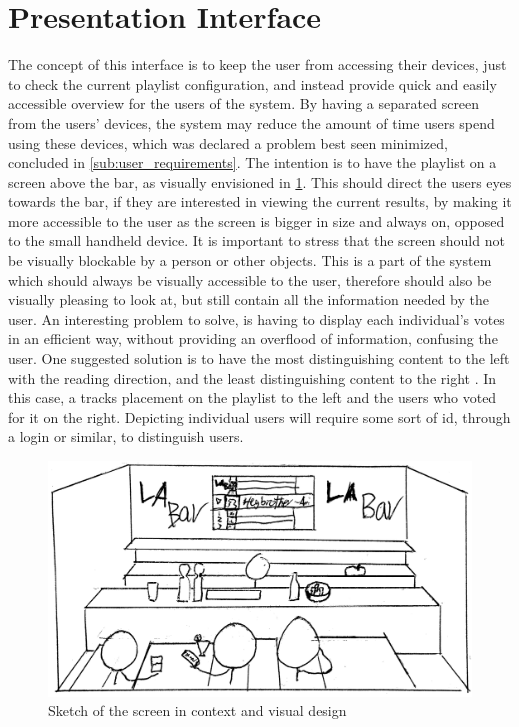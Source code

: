 \section{Presentation Interface}

The concept of this interface is to keep the user from accessing their devices, just to check the current playlist configuration, and instead provide quick and easily accessible overview for the users of the system. By having a separated screen from the users' devices, the system may reduce the amount of time users spend using these devices, which was declared a problem best seen minimized, concluded in \cref{sub:user_requirements}. The intention is to have the playlist on a screen above the bar, as visually envisioned in \cref{fig:PresentationInterface}. This should direct the users eyes towards the bar, if they are interested in viewing the current results, by making it more accessible to the user as the screen is bigger in size and always on, opposed to the small handheld device\cite{DEB}. It is important to stress that the screen should not be visually blockable by a person or other objects.
This is a part of the system which should always be visually accessible to the user, therefore should also be visually pleasing to look at, but still contain all the information needed by the user. An interesting problem to solve, is having to display each individual's votes in an efficient way, without providing an overflood of information, confusing the user. One suggested solution is to have the most distinguishing content to the left with the reading direction, and the least distinguishing content to the right \cite{material}. In this case, a tracks placement on the playlist to the left and the users who voted for it on the right. Depicting individual users will require some sort of id, through a login or similar, to distinguish users.

\begin{figure}[hbtp]
  \centering
  \includegraphics[width=1.0\linewidth]{Images/presentation.png}
  \caption{Sketch of the screen in context and visual design}\label{fig:PresentationInterface}
\end{figure}
